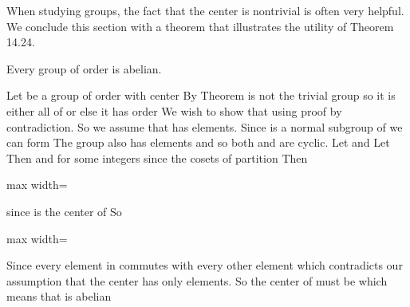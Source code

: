 \documentclass[11pt,oneside]{article}
\begin{document}
\BookNarrativetrue

\begin{BookBody}

\noindent When studying groups, the fact that the center is nontrivial is often very helpful. We conclude this section with a theorem that illustrates the utility of Theorem 14.24.

 Every group of order  is abelian.

 Let  be a group of order  with center  By Theorem  is not the trivial group so it is either all of  or else it has order  We wish to show that  using proof by contradiction. So we assume that  has  elements. Since  is a normal subgroup of  we can form  The group  also has  elements and so both  and  are cyclic. Let  and  Let  Then  and  for some integers  since the cosets of  partition  Then

\begin{center}\begin{adjustbox}{max width=\linewidth}\end{adjustbox}\end{center}

\noindent since  is the center of  So

\begin{center}\begin{adjustbox}{max width=\linewidth}\end{adjustbox}\end{center}

\noindent Since every element in  commutes with every other element which contradicts our assumption that the center has only  elements. So the center of  must be  which means that  is abelian\BookEnd{\blacklozenge}


\end{BookBody}
\end{document}
